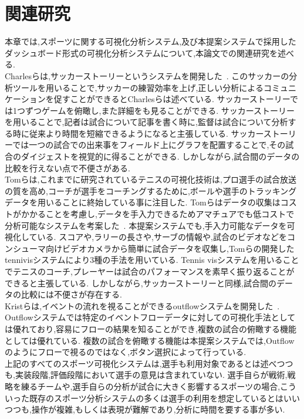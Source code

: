 \documentclass[sotsuron]{kuee}
\begin{document}
\chapter{関連研究}
	本章では,スポーツに関する可視化分析システム,及び本提案システムで採用したダッシュボード形式の可視化分析システムについて,本論文での関連研究を述べる.
	\\Charlesらは,サッカーストーリーというシステムを開発した~\cite{SoccerStory}.
	このサッカーの分析ツールを用いることで,サッカーの練習効率を上げ,正しい分析によるコミュニケーションを促すことができるとCharlesらは述べている.
	サッカーストーリーでは1つずつゲームを俯瞰し,また詳細をも見ることができる.
	サッカーストーリーを用いることで,記者は試合について記事を書く時に,監督は試合について分析する時に従来より時間を短縮できるようになると主張している.
	サッカーストーリーでは一つの試合での出来事をフィールド上にグラフを配置することで,その試合のダイジェストを視覚的に得ることができる.
	しかしながら,試合間のデータの比較を行えない点で不便さがある.
	\\Tomらは,これまでに研究されているテニスの可視化技術は,プロ選手の試合放送の質を高め,コーチが選手をコーチングするために,ボールや選手のトラッキングデータを用いることに終始している事に注目した.
	Tomらはデータの収集はコストがかかることを考慮し,データを手入力できるためアマチュアでも低コストで分析可能なシステムを考案した~\cite{TenniVis}.
	本提案システムでも,手入力可能なデータを可視化している.
	スコアや,ラリーの長さや,サーブの情報や,試合のビデオなどをコンシューマ向けビデオカメラから簡単に試合データを収集し,Tomらの開発したtennivisシステムにより3種の手法を用いている.
	Tennis visシステムを用いることでテニスのコーチ,プレーヤーは試合のパフォーマンスを素早く振り返ることができると主張している.
	しかしながら,サッカーストーリーと同様,試合間のデータの比較には不便さが存在する.
	\\Kristらは,イベントの流れを視ることができるoutflowシステムを開発した~\cite{Outflow}.
	Outflowシステムでは特定のイベントフローデータに対しての可視化手法としては優れており,容易にフローの結果を知ることができ,複数の試合の俯瞰する機能としては優れている.
	複数の試合を俯瞰する機能は本提案システムでは,Outflowのようにフローで視るのではなく,ボタン選択によって行っている.	
	\\上記のすべてのスポーツ可視化システムは,選手も利用対象であるとは述べつつも,実装段階,評価段階において選手の意見は含まれていない.
	選手自らが戦術,戦略を練るチームや,選手自らの分析が試合に大きく影響するスポーツの場合,こういった既存のスポーツ分析システムの多くは選手の利用を想定しているとはいいつつも,操作が複雑,もしくは表現が難解であり,分析に時間を要する事が多い.
\end{document}
